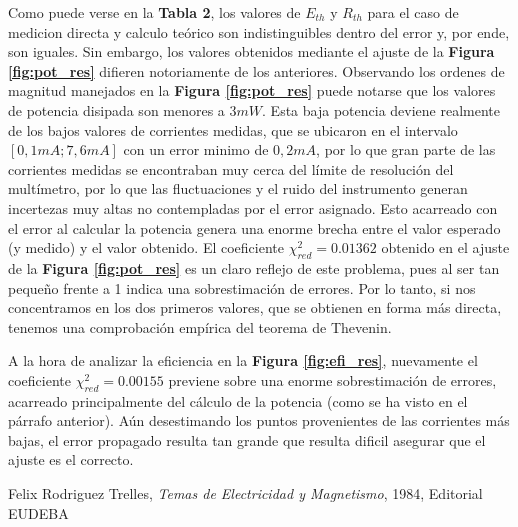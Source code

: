 \documentclass[11pt,a4paper]{article}
\begin{document}
Como puede verse en la \textbf{Tabla 2}, los valores de $E_{th}$ y $R_{th}$ para el caso de medicion directa y calculo teórico son indistinguibles dentro del error y, por ende, son iguales. Sin embargo, los valores obtenidos mediante el ajuste de la \textbf{Figura \ref{fig:pot_res}} difieren notoriamente de los anteriores. Observando los ordenes de magnitud manejados en la \textbf{Figura \ref{fig:pot_res}} puede notarse que los valores de potencia disipada son menores a $3mW$. Esta baja potencia deviene realmente de los bajos valores de corrientes medidas, que se ubicaron en el intervalo $[0,1mA;7,6mA]$ con un error minimo de $0,2mA$, por lo que gran parte de las corrientes medidas se encontraban muy cerca del límite de resolución del multímetro, por lo que las fluctuaciones y el ruido del instrumento generan incertezas muy altas no contempladas por el error asignado. Esto acarreado con el error al calcular la potencia genera una enorme brecha entre el valor esperado (y medido) y el valor obtenido. El coeficiente $\chi_{red}^{2} = 0.01362$ obtenido en el ajuste de la \textbf{Figura \ref{fig:pot_res}} es un claro reflejo de este problema, pues al ser tan pequeño frente a 1 indica una sobrestimación de errores. Por lo tanto, si nos concentramos en los dos primeros valores, que se obtienen en forma más directa, tenemos una comprobación empírica del teorema de Thevenin. 

A la hora de analizar la eficiencia en la \textbf{Figura \ref{fig:efi_res}}, nuevamente el coeficiente $\chi_{red}^{2} = 0.00155$ previene sobre una enorme sobrestimación de errores, acarreado principalmente del cálculo de la potencia (como se ha visto en el párrafo anterior). Aún desestimando los puntos provenientes de las corrientes más bajas, el error propagado resulta tan grande que resulta dificil asegurar que el ajuste es el correcto. 






\begin{thebibliography}{1}
  Felix Rodriguez Trelles, \textit{Temas de Electricidad y Magnetismo}, 1984, Editorial EUDEBA
\end{thebibliography}
 
\end{document}
